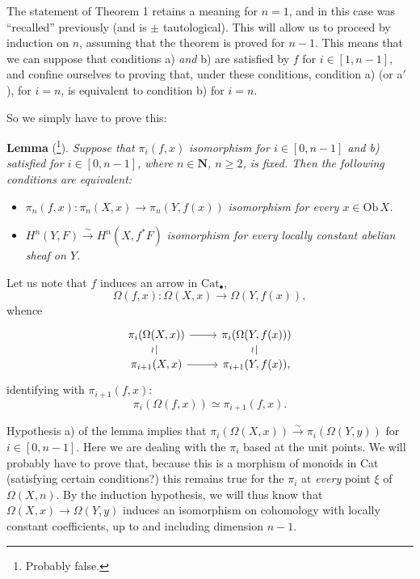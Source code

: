 \documentclass[11pt]{article}
\newcommand{\printedpage}[1]{\marginpar{\footnotesize p.~#1}}
\newcommand{\msp}[1]{\marginpar{\footnotesize [#1]}}
\newcommand{\Ob}{\mathrm{Ob}\,}
\begin{document}
The statement of Theorem 1 retains a meaning for $n = 1$, and in this case was ``recalled'' previously (and is $\pm$ tautological). This will allow us to proceed by induction on $n$, assuming that the theorem is proved for $n-1$. This means that we can suppose that conditions a) \textit{and} b) are satisfied by $f$ for $i \in [1,n-1]$, and confine ourselves to proving that, under these conditions, condition a) (or a$'$), for $i = n$, is equivalent to condition b) for $i = n$.

\msp{page 177}

So we simply have to prove this:

\textbf{Lemma} (\footnote[115]{Probably false.}). \textit{Suppose that $\pi_i(f,x)$} \textit{isomorphism for $i \in [0,n-1]$ and b) satisfied for $i \in [0,n-1]$, where $n \in \mathbf{N}$, $n \geq 2$, is fixed. Then the following conditions are equivalent:}

\begin{itemize}
\item[\textit{a)}] $\pi_n(f,x) : \pi_n(X,x) \longrightarrow \pi_n(Y,f(x))$ \textit{isomorphism for every $x \in \Ob X$.}

\item[\textit{b)}] $H^n(Y,F) \xrightarrow{\sim} H^n(X,f^*F)$ \textit{isomorphism for every locally constant abelian sheaf on $Y$.}
\end{itemize}

Let us note that $f$ induces an arrow in $\mathrm{Cat}_\bullet$,
\[
\Omega(f,x) : \Omega(X,x) \longrightarrow \Omega(Y,f(x)),
\]
whence
\[
\begin{tikzcd}[row sep=small]
\pi_i(\Omega(X,x)) \arrow[r] \arrow[d, dash, "\wr"'] & \pi_i(\Omega(Y,f(x))) \arrow[d, dash, "\wr"'] \\
\pi_{i+1}(X,x) \arrow[r] & \pi_{i+1}(Y,f(x)),
\end{tikzcd}
\]
identifying with $\pi_{i+1}(f,x)$:
\[
\pi_i(\Omega(f,x)) \simeq \pi_{i+1}(f,x).
\]


\printedpage{119}

Hypothesis a) of the lemma implies that $\pi_i(\Omega(X,x)) \xrightarrow{\sim} \pi_i(\Omega(Y,y))$ for $i \in [0,n-1]$. Here we are dealing with the $\pi_i$ based at the unit points. We will probably have to prove that, because this is a morphism of monoids in Cat (satisfying certain conditions?) this remains true for the $\pi_i$ at \textit{every} point $\xi$ of $\Omega(X,n)$. By the induction hypothesis, we will thus know that $\Omega(X,x) \longrightarrow \Omega(Y,y)$ %
\msp{page 178}
induces an isomorphism on cohomology with locally constant coefficients, up to and including dimension $n-1$.
\end{document}

